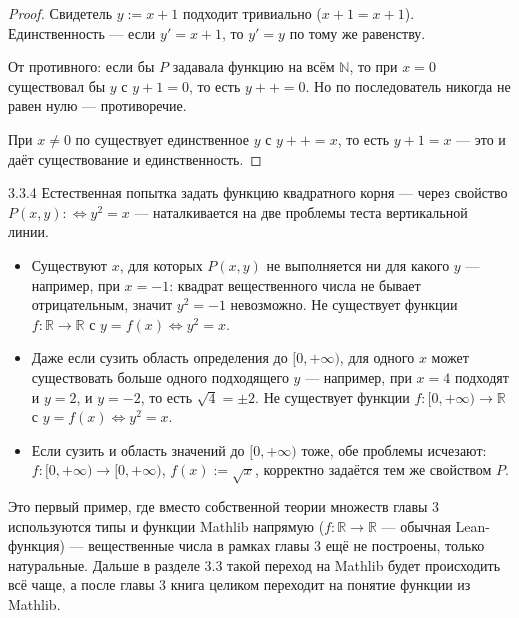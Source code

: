 \begin{proof}
 Свидетель $y:=x+1$ подходит тривиально ($x+1=x+1$). Единственность — если
$y'=x+1$, то $y'=y$ по тому же равенству.

 От противного: если бы $P$ задавала функцию на всём $\mathbb{N}$, то при
$x=0$ существовал бы $y$ с $y+1=0$, то есть $y{+}{+}=0$. Но по 
последователь никогда не равен нулю — противоречие.

 При $x \neq 0$ по 
существует единственное $y$ с $y{+}{+}=x$, то есть $y+1=x$ — это и даёт существование и
единственность.
\end{proof}

\begin{example}{3.3.4}{}
Естественная попытка задать функцию квадратного корня — через свойство $P(x,y):\iff y^2=x$ —
наталкивается на две проблемы теста вертикальной линии.
\begin{itemize}
  \item[(a)] Существуют $x$, для которых $P(x,y)$ не выполняется ни для какого $y$ — например,
        при $x=-1$: квадрат вещественного числа не бывает отрицательным, значит $y^2=-1$
        невозможно. Не существует функции $f:\mathbb{R}\to\mathbb{R}$ с $y=f(x)\iff y^2=x$.
  \item[(b)] Даже если сузить область определения до $[0,+\infty)$, для одного $x$ может
        существовать больше одного подходящего $y$ — например, при $x=4$ подходят и $y=2$, и
        $y=-2$, то есть $\sqrt4=\pm2$. Не существует функции $f:[0,+\infty)\to\mathbb{R}$ с
        $y=f(x)\iff y^2=x$.
  \item[(c)] Если сузить и область значений до $[0,+\infty)$ тоже, обе проблемы исчезают:
        $f:[0,+\infty)\to[0,+\infty)$, $f(x):=\sqrt{x}$, корректно задаётся тем же свойством
        $P$.
\end{itemize}
\end{example}

\begin{remark}
Это первый пример, где вместо собственной теории множеств главы 3 используются типы и функции
Mathlib напрямую ($f : \mathbb{R} \to \mathbb{R}$ — обычная Lean-функция) — вещественные числа
в рамках главы 3 ещё не построены, только
натуральные. Дальше в разделе 3.3 такой переход на Mathlib будет происходить всё чаще, а после
главы 3 книга целиком переходит на понятие функции из Mathlib.
\end{remark}

